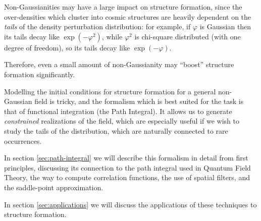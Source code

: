\documentclass[main.tex]{subfiles}
\begin{document}
Non-Gaussianities may have a large impact on structure formation, since the over-densities which cluster into cosmic structures are heavily dependent on the \emph{tails} of the density perturbation distribution: for example, if \(\varphi \) is Gaussian then its tails decay like \(\exp(- \varphi^2)\), while \(\varphi^2\) is chi-square distributed (with one degree of freedom), so its tails decay like \(\exp(- \varphi )\).

Therefore, even a small amount of non-Gaussianity may ``boost'' structure formation significantly.

Modelling the initial conditions for structure formation for a general non-Gaussian field is tricky, and the formalism which is best suited for the task is that of functional integration (the Path Integral). 
It allows us to generate \emph{constrained} realizations of the field, which are especially useful if we wish to study the tails of the distribution, which are naturally connected to rare occurrences. 

In section \ref{sec:path-integral} we will describe this formalism in detail from first principles, discussing its connection to the path integral used in Quantum Field Theory, the way to compute correlation functions, the use of spatial filters, and the saddle-point approximation. 

In section \ref{sec:applications} we will discuss the applications of these techniques to structure formation. 
\end{document}
